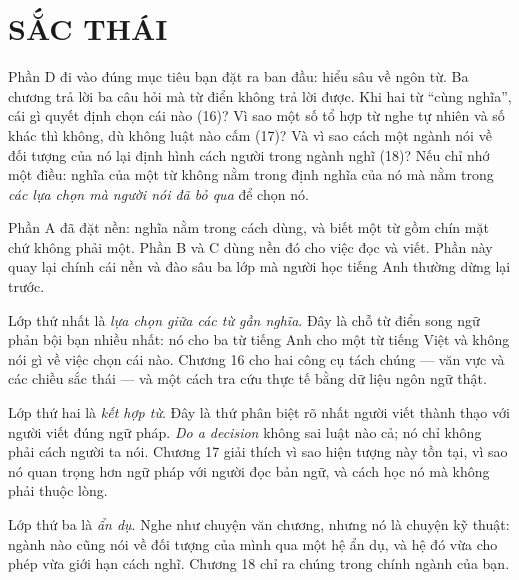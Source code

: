 \documentclass[../english.tex]{subfiles}
\begin{document}
\part{SẮC THÁI}
\begin{tomtat}
Phần D đi vào đúng mục tiêu bạn đặt ra ban đầu: hiểu sâu về ngôn từ. Ba chương trả lời ba câu hỏi mà từ điển không trả lời được. Khi hai từ ``cùng nghĩa'', cái gì quyết định chọn cái nào (16)? Vì sao một số tổ hợp từ nghe tự nhiên và số khác thì không, dù không luật nào cấm (17)? Và vì sao cách một ngành nói về đối tượng của nó lại định hình cách người trong ngành nghĩ (18)? Nếu chỉ nhớ một điều: nghĩa của một từ không nằm trong định nghĩa của nó mà nằm trong \emph{các lựa chọn mà người nói đã bỏ qua} để chọn nó.
\end{tomtat}

Phần A đã đặt nền: nghĩa nằm trong cách dùng, và biết một từ gồm chín mặt chứ không phải một. Phần B và C dùng nền đó cho việc đọc và viết. Phần này quay lại chính cái nền và đào sâu ba lớp mà người học tiếng Anh thường dừng lại trước.

Lớp thứ nhất là \emph{lựa chọn giữa các từ gần nghĩa}. Đây là chỗ từ điển song ngữ phản bội bạn nhiều nhất: nó cho ba từ tiếng Anh cho một từ tiếng Việt và không nói gì về việc chọn cái nào. Chương 16 cho hai công cụ tách chúng --- văn vực và các chiều sắc thái --- và một cách tra cứu thực tế bằng dữ liệu ngôn ngữ thật.

Lớp thứ hai là \emph{kết hợp từ}. Đây là thứ phân biệt rõ nhất người viết thành thạo với người viết đúng ngữ pháp. \emph{Do a decision} không sai luật nào cả; nó chỉ không phải cách người ta nói. Chương 17 giải thích vì sao hiện tượng này tồn tại, vì sao nó quan trọng hơn ngữ pháp với người đọc bản ngữ, và cách học nó mà không phải thuộc lòng.

Lớp thứ ba là \emph{ẩn dụ}. Nghe như chuyện văn chương, nhưng nó là chuyện kỹ thuật: ngành nào cũng nói về đối tượng của mình qua một hệ ẩn dụ, và hệ đó vừa cho phép vừa giới hạn cách nghĩ. Chương 18 chỉ ra chúng trong chính ngành của bạn.




\ifSubfilesClassLoaded{\printbibliography[title={Nguồn}]}{}
\end{document}
